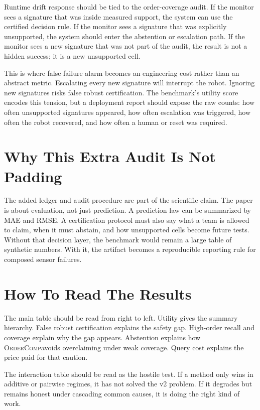 \documentclass{article}
\newcommand{\method}{\textsc{OrderComp}}
\begin{document}
Runtime drift response should be tied to the order-coverage audit. If the monitor sees a signature that was inside measured support, the system can use the certified decision rule. If the monitor sees a signature that was explicitly unsupported, the system should enter the abstention or escalation path. If the monitor sees a new signature that was not part of the audit, the result is not a hidden success; it is a new unsupported cell.

This is where false failure alarm becomes an engineering cost rather than an abstract metric. Escalating every new signature will interrupt the robot. Ignoring new signatures risks false robust certification. The benchmark's utility score encodes this tension, but a deployment report should expose the raw counts: how often unsupported signatures appeared, how often escalation was triggered, how often the robot recovered, and how often a human or reset was required.

\section{Why This Extra Audit Is Not Padding}

The added ledger and audit procedure are part of the scientific claim. The paper is about evaluation, not just prediction. A prediction law can be summarized by MAE and RMSE. A certification protocol must also say what a team is allowed to claim, when it must abstain, and how unsupported cells become future tests. Without that decision layer, the benchmark would remain a large table of synthetic numbers. With it, the artifact becomes a reproducible reporting rule for composed sensor failures.

\section{How To Read The Results}

The main table should be read from right to left. Utility gives the summary hierarchy. False robust certification explains the safety gap. High-order recall and coverage explain why the gap appears. Abstention explains how \method avoids overclaiming under weak coverage. Query cost explains the price paid for that caution.

The interaction table should be read as the hostile test. If a method only wins in additive or pairwise regimes, it has not solved the v2 problem. If it degrades but remains honest under cascading common causes, it is doing the right kind of work.
\end{document}
